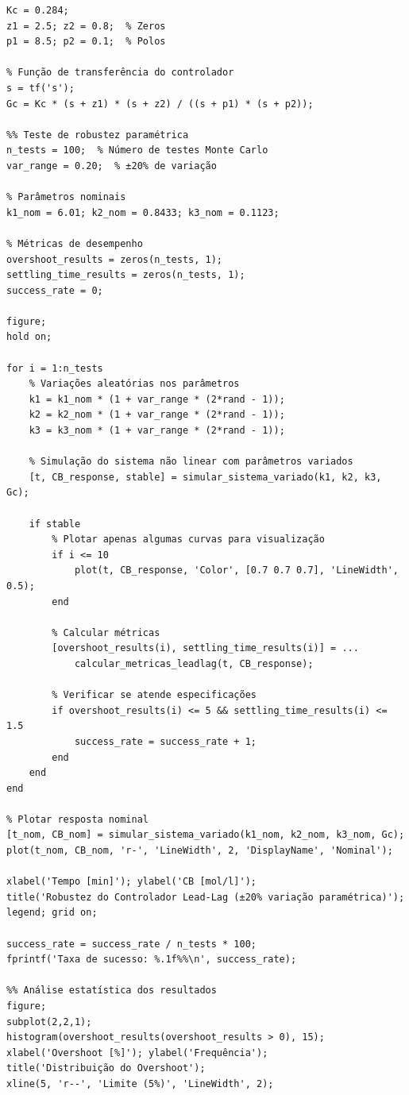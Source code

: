 \documentclass[a4paper,12pt]{article}
\begin{document}
\begin{lstlisting}[caption=Simulação de robustez - Controlador Lead-Lag]
%% Parâmetros do controlador Lead-Lag projetado
Kc = 0.284;
z1 = 2.5; z2 = 0.8;  % Zeros
p1 = 8.5; p2 = 0.1;  % Polos

% Função de transferência do controlador
s = tf('s');
Gc = Kc * (s + z1) * (s + z2) / ((s + p1) * (s + p2));

%% Teste de robustez paramétrica
n_tests = 100;  % Número de testes Monte Carlo
var_range = 0.20;  % ±20% de variação

% Parâmetros nominais
k1_nom = 6.01; k2_nom = 0.8433; k3_nom = 0.1123;

% Métricas de desempenho
overshoot_results = zeros(n_tests, 1);
settling_time_results = zeros(n_tests, 1);
success_rate = 0;

figure;
hold on;

for i = 1:n_tests
    % Variações aleatórias nos parâmetros
    k1 = k1_nom * (1 + var_range * (2*rand - 1));
    k2 = k2_nom * (1 + var_range * (2*rand - 1));
    k3 = k3_nom * (1 + var_range * (2*rand - 1));
    
    % Simulação do sistema não linear com parâmetros variados
    [t, CB_response, stable] = simular_sistema_variado(k1, k2, k3, Gc);
    
    if stable
        % Plotar apenas algumas curvas para visualização
        if i <= 10
            plot(t, CB_response, 'Color', [0.7 0.7 0.7], 'LineWidth', 0.5);
        end
        
        % Calcular métricas
        [overshoot_results(i), settling_time_results(i)] = ...
            calcular_metricas_leadlag(t, CB_response);
        
        % Verificar se atende especificações
        if overshoot_results(i) <= 5 && settling_time_results(i) <= 1.5
            success_rate = success_rate + 1;
        end
    end
end

% Plotar resposta nominal
[t_nom, CB_nom] = simular_sistema_variado(k1_nom, k2_nom, k3_nom, Gc);
plot(t_nom, CB_nom, 'r-', 'LineWidth', 2, 'DisplayName', 'Nominal');

xlabel('Tempo [min]'); ylabel('CB [mol/l]');
title('Robustez do Controlador Lead-Lag (±20% variação paramétrica)');
legend; grid on;

success_rate = success_rate / n_tests * 100;
fprintf('Taxa de sucesso: %.1f%%\n', success_rate);

%% Análise estatística dos resultados
figure;
subplot(2,2,1);
histogram(overshoot_results(overshoot_results > 0), 15);
xlabel('Overshoot [%]'); ylabel('Frequência');
title('Distribuição do Overshoot');
xline(5, 'r--', 'Limite (5%)', 'LineWidth', 2);


\end{lstlisting}
\end{document}
